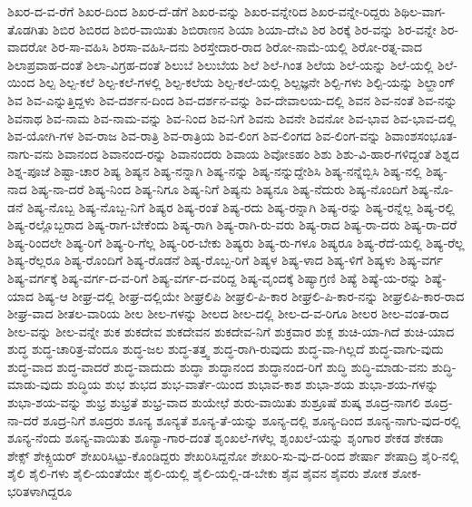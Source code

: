 {ಶಿಖರ-ದ-ವ-ರೆಗೆ
ಶಿಖರ-ದಿಂದ
ಶಿಖರ-ದೆ-ಡೆಗೆ
ಶಿಖರ-ವನ್ನು
ಶಿಖರ-ವನ್ನೇರಿದ
ಶಿಖರ-ವನ್ನೇ-ರಿದ್ದರು
ಶಿಥಿಲ-ವಾಗ-ತೊಡಗಿತು
ಶಿಬಿರ
ಶಿಬಿರದ
ಶಿಬಿರ-ವಾಯಿತು
ಶಿಬಿರಾಣನ
ಶಿಯಾ
ಶಿಯಾ-ದೇವಿ
ಶಿರ
ಶಿರಕ್ಕೆ
ಶಿರ-ವನ್ನು
ಶಿರ-ವನ್ನೇ
ಶಿರ-ವಾದರೋ
ಶಿರ-ಸಾ-ವಹಿಸಿ
ಶಿರಸಾ-ವಹಿಸಿ-ದನು
ಶಿರಸ್ತೇದಾರ-ರಾದ
ಶಿರೋ-ನಾಮೆ-ಯಲ್ಲಿ
ಶಿರೋ-ರತ್ನ-ವಾದ
ಶಿಲಾಪ್ರವಾಹ-ದಂತೆ
ಶಿಲಾ-ವಿಗ್ರಹ-ದಂತೆ
ಶಿಲುಬೆ
ಶಿಲುಬೆಯ
ಶಿಲೆ
ಶಿಲೆ-ಗಿಂತ
ಶಿಲೆಯ
ಶಿಲೆ-ಯನ್ನು
ಶಿಲೆ-ಯಲ್ಲಿ
ಶಿಲೆ-ಯಿಂದ
ಶಿಲ್ಪ
ಶಿಲ್ಪ-ಕಲೆ
ಶಿಲ್ಪ-ಕಲೆ-ಗಳಲ್ಲಿ
ಶಿಲ್ಪ-ಕಲೆಯ
ಶಿಲ್ಪ-ಕಲೆ-ಯಲ್ಲಿ
ಶಿಲ್ಪಜ್ಞನೇ
ಶಿಲ್ಪಿ-ಗಳು
ಶಿಲ್ಪಿ-ಯನ್ನು
ಶಿಲ್ಹಾಂಗ್
ಶಿವ
ಶಿವ-ಎನ್ನುತ್ತಿದ್ದಳು
ಶಿವ-ದರ್ಶನ-ದಿಂದ
ಶಿವ-ದರ್ಶನ-ವನ್ನು
ಶಿವ-ದೇವಾಲಯ-ದಲ್ಲಿ
ಶಿವನ
ಶಿವ-ನಂತೆ
ಶಿವ-ನನ್ನು
ಶಿವನಾಥ
ಶಿವ-ನಾಮ
ಶಿವ-ನಾಮ-ವನ್ನು
ಶಿವ-ನಿಂದ
ಶಿವ-ನಿಗೆ
ಶಿವನು
ಶಿವನೇ
ಶಿವನೋ
ಶಿವ-ಭಾವ
ಶಿವ-ಭಾವ-ದಲ್ಲಿ
ಶಿವ-ಯೋಗಿ-ಗಳ
ಶಿವ-ರಾಜ
ಶಿವ-ರಾತ್ರಿ
ಶಿವ-ರಾತ್ರಿಯ
ಶಿವ-ಲಿಂಗ
ಶಿವ-ಲಿಂಗದ
ಶಿವ-ಲಿಂಗ-ವನ್ನು
ಶಿವಾಂಶಸಂಭೂತ-ನಾಗು-ವನು
ಶಿವಾನಂದ
ಶಿವಾನಂದ-ರನ್ನು
ಶಿವಾನಂದರು
ಶಿವಾಯ
ಶಿವೋಽಹಂ
ಶಿಶು
ಶಿಶು-ವಿ-ಹಾರ-ಗಳಿದ್ದಂತೆ
ಶಿಶ್ನದ
ಶಿಶ್ನ-ಪೂಜೆ
ಶಿಷ್ಟಾ-ಚಾರ
ಶಿಷ್ಯ
ಶಿಷ್ಯನ
ಶಿಷ್ಯ-ನನ್ನಾಗಿ
ಶಿಷ್ಯ-ನನ್ನು
ಶಿಷ್ಯ-ನನ್ನುದ್ದೇಶಿಸಿ
ಶಿಷ್ಯ-ನನ್ನೆಬ್ಬಿಸಿ
ಶಿಷ್ಯ-ನಲ್ಲಿ
ಶಿಷ್ಯ-ನಾದ
ಶಿಷ್ಯ-ನಾ-ದರೆ
ಶಿಷ್ಯ-ನಿಂದ
ಶಿಷ್ಯ-ನಿಗೂ
ಶಿಷ್ಯ-ನಿಗೆ
ಶಿಷ್ಯನು
ಶಿಷ್ಯನೂ
ಶಿಷ್ಯ-ನೆದುರು
ಶಿಷ್ಯ-ನೊಂದಿಗೆ
ಶಿಷ್ಯ-ನೊ-ಡನೆ
ಶಿಷ್ಯ-ನೊಬ್ಬ
ಶಿಷ್ಯ-ನೊಬ್ಬ-ನಿಗೆ
ಶಿಷ್ಯರ
ಶಿಷ್ಯ-ರಂತೆ
ಶಿಷ್ಯ-ರದು
ಶಿಷ್ಯ-ರನ್ನಾಗಿ
ಶಿಷ್ಯ-ರನ್ನು
ಶಿಷ್ಯ-ರನ್ನೆಲ್ಲ
ಶಿಷ್ಯ-ರಲ್ಲಿ
ಶಿಷ್ಯ-ರಲ್ಲೊಬ್ಬರಾದ
ಶಿಷ್ಯ-ರಾಗ-ಬೇಕೆಂದು
ಶಿಷ್ಯ-ರಾಗಿ
ಶಿಷ್ಯ-ರಾಗಿ-ರು-ವರು
ಶಿಷ್ಯ-ರಾದ
ಶಿಷ್ಯ-ರಾ-ದರು
ಶಿಷ್ಯ-ರಾ-ದರೆ
ಶಿಷ್ಯ-ರಿಂದಲೇ
ಶಿಷ್ಯ-ರಿಗೆ
ಶಿಷ್ಯ-ರಿ-ಗೆಲ್ಲ
ಶಿಷ್ಯ-ರಿರ-ಬೇಕು
ಶಿಷ್ಯರು
ಶಿಷ್ಯ-ರು-ಗಳೂ
ಶಿಷ್ಯರೂ
ಶಿಷ್ಯ-ರೆದೆ-ಯಲ್ಲಿ
ಶಿಷ್ಯ-ರೆಲ್ಲ
ಶಿಷ್ಯ-ರೆಲ್ಲರೂ
ಶಿಷ್ಯ-ರೊಂದಿಗೆ
ಶಿಷ್ಯ-ರೊಡನೆ
ಶಿಷ್ಯ-ರೊಬ್ಬ-ರಿಗೆ
ಶಿಷ್ಯಳ
ಶಿಷ್ಯ-ಳಾದ
ಶಿಷ್ಯ-ಳಿಗೆ
ಶಿಷ್ಯಳು
ಶಿಷ್ಯ-ವರ್ಗ
ಶಿಷ್ಯ-ವರ್ಗಕ್ಕೆ
ಶಿಷ್ಯ-ವರ್ಗ-ದ-ವ-ರಿಗೆ
ಶಿಷ್ಯ-ವರ್ಗ-ದ-ವರಿದ್ದ
ಶಿಷ್ಯ-ವೃಂದಕ್ಕೆ
ಶಿಷ್ಯಾಗ್ರಣಿ
ಶಿಷ್ಯೆ
ಶಿಷ್ಯೆ-ಯ-ರನ್ನು
ಶಿಷ್ಯೆ-ಯಾದ
ಶಿಷ್ಯ-ಆ
ಶೀಘ್ರ-ದಲ್ಲಿ
ಶೀಘ್ರ-ದಲ್ಲಿಯೇ
ಶೀಘ್ರಲಿಪಿ
ಶೀಘ್ರಲಿ-ಪಿ-ಕಾರ
ಶೀಘ್ರಲಿ-ಪಿ-ಕಾರ-ನನ್ನು
ಶೀಘ್ರಲಿಪಿ-ಕಾರ-ರಾದ
ಶೀಘ್ರ-ವಾದ
ಶೀತಲ-ವಾರಿಯ
ಶೀಲ
ಶೀಲ-ಗಳನ್ನು
ಶೀಲದ
ಶೀಲ-ದಲ್ಲಿ
ಶೀಲ-ದ-ವ-ರಿಗೂ
ಶೀಲರ
ಶೀಲ-ವಂತ-ರಾದ
ಶೀಲ-ವನ್ನು
ಶೀಲ-ವನ್ನೇ
ಶುಕ
ಶುಕದೇವ
ಶುಕದೇವನ
ಶುಕದೇವ-ನಿಗೆ
ಶುಕ್ರವಾರ
ಶುಕ್ಲ
ಶುಚಿ-ಯಾ-ಗಿದೆ
ಶುಚಿ-ಯಾದ
ಶುದ್ಧ
ಶುದ್ಧ-ಚಾರಿತ್ರ-ವೆಂದೂ
ಶುದ್ಧ-ಜಲ
ಶುದ್ಧ-ತತ್ತ್ವ
ಶುದ್ಧ-ರಾಗಿ-ರುವುದು
ಶುದ್ಧ-ವಾ-ಗಿಲ್ಲದೆ
ಶುದ್ಧ-ವಾಗು-ವುದು
ಶುದ್ಧ-ವಾದ
ಶುದ್ಧ-ವಾದರೆ
ಶುದ್ಧ-ವಾದುದು
ಶುದ್ಧಾ
ಶುದ್ಧಾನಂದ
ಶುದ್ಧಾನಂದ-ರಿಗೆ
ಶುದ್ಧಿ
ಶುದ್ಧಿ-ಮಾಡು-ವನು
ಶುದ್ಧಿ-ಮಾಡು-ವುದು
ಶುದ್ಧಿಯ
ಶುಭ
ಶುಭದ
ಶುಭ-ವಾರ್ತೆ-ಯಿಂದ
ಶುಭಾವ-ಕಾಶ
ಶುಭಾ-ಶಯ
ಶುಭಾ-ಶಯ-ಗಳನ್ನು
ಶುಭಾ-ಶಯ-ವನ್ನು
ಶುಭ್ರ
ಶುಭ್ರತೆ
ಶುಭ್ರ-ವಾದ
ಶುಯೇಛೆ
ಶುರು-ವಾಯಿತು
ಶುಶ್ರೂಷೆ
ಶುಷ್ಕ
ಶೂದ್ರ-ನಾಗಲಿ
ಶೂದ್ರ-ನಾ-ದರೆ
ಶೂದ್ರ-ನಿಗೆ
ಶೂದ್ರರು
ಶೂನ್ಯ
ಶೂನ್ಯತೆ
ಶೂನ್ಯ-ತೆ-ಯನ್ನು
ಶೂನ್ಯ-ದಲ್ಲಿ
ಶೂನ್ಯ-ದಿಂದ
ಶೂನ್ಯ-ನಾಗು-ವುದ-ರಲ್ಲಿ
ಶೂನ್ಯ-ನೆಂದು
ಶೂನ್ಯ-ವಾಯಿತು
ಶೂನ್ಯಾ-ಗಾರ-ದಂತೆ
ಶೃಂಖಲೆ-ಗಳೆಲ್ಲ
ಶೃಂಖಲೆ-ಯನ್ನು
ಶೃಂಗಾರ
ಶೇಕಡ
ಶೇಕಡಾ
ಶೇಕ್ಸ್
ಶೇಕ್ಸ್ಪಿಯರ್
ಶೇಖರಿಸಿಟ್ಟು-ಕೊಂಡಿದ್ದರು
ಶೇಖರಿಸಿದ್ದನೋ
ಶೇಖರಿ-ಸು-ವು-ದ-ರಿಂದ
ಶೇರ್ಷಾ
ಶೇಷಾದ್ರಿ
ಶೈರಿ-ನಲ್ಲಿ
ಶೈಲಿ
ಶೈಲಿ-ಗಳು
ಶೈಲಿ-ಯಂತೆಯೇ
ಶೈಲಿ-ಯಲ್ಲಿ
ಶೈಲಿ-ಯಲ್ಲಿ-ಡ-ಬೇಕು
ಶೈವ
ಶೈವನ
ಶೈವರು
ಶೋಕ
ಶೋಕ-ಭರಿತಳಾಗಿದ್ದರೂ
}
